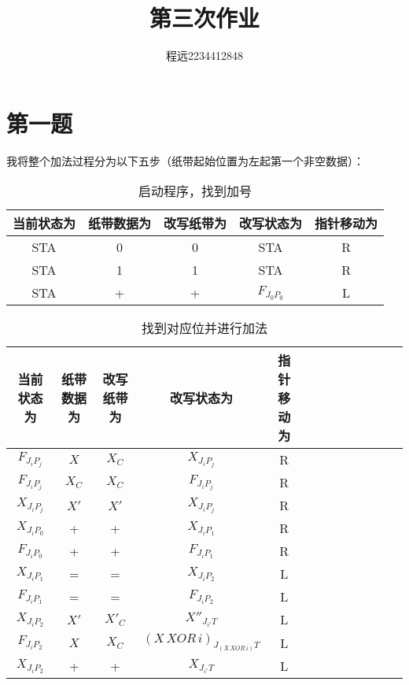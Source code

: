\documentclass[UTF8]{ctexart}
\begin{document}
\title{\vspace{0cm}第三次作业}
\author{程远2234412848}
\date{}
\maketitle

\section{第一题}

我将整个加法过程分为以下五步（纸带起始位置为左起第一个非空数据）：
\begin{table}[h!]
    \begin{center}
        \caption{启动程序，找到加号}
        \begin{tabular}{|c|c|c|c|c|}
            \hline
            当前状态为 & 纸带数据为 & 改写纸带为 & 改写状态为 & 指针移动为 \\
            \hline
            STA & 0 & 0 & STA & R \\
            \hline
            STA & 1 & 1 & STA & R \\
            \hline
            STA & + & + & $F_{J_{0}P_{0}}$ & L \\
            \hline
        \end{tabular}
    \end{center}
\end{table}


\begin{table}[h!]
    \begin{center}
        \caption{找到对应位并进行加法}
        \begin{tabular}{|c|c|c|c|c|c|c|c|c|c|c|c|c|}
            \hline
            当前状态为 & 纸带数据为 & 改写纸带为 & 改写状态为 & 指针移动为 \\
            \hline
            $F_{J_{i}P_{j}}$ & $X$ & $X_{C}$ & $X_{J_{i}P_{j}}$ & R \\
            \hline
            $F_{J_{i}P_{j}}$ & $X_{C}$ & $X_{C}$ & $F_{J_{i}P_{j}}$ & R \\
            \hline
            $X_{J_{i}P_{j}}$ & $X'$ & $X'$ & $X_{J_{i}P_{j}}$ & R \\
            \hline
            $X_{J_{i}P_{0}}$ & + & + & $X_{J_{i}P_{1}}$ & R \\
            \hline
            $F_{J_{i}P_{0}}$ & + & + & $F_{J_{i}P_{1}}$ & R \\
            \hline
            $X_{J_{i}P_{1}}$ & = & = & $X_{J_{i}P_{2}}$ & L \\
            \hline
            $F_{J_{i}P_{1}}$ & = & = & $F_{J_{i}P_{2}}$ & L \\
            \hline
            $X_{J_{i}P_{2}}$ & $X'$ & $X'_{C}$ & $X''_{J_{i'}T}$ & L \\
            \hline
            $F_{J_{i}P_{2}}$ & $X$ & $X_{C}$ & $(X\,XOR\,i)_{J_{(X\,XOR\,i)}T}$ & L\\
            \hline
            $X_{J_{i}P_{2}}$ & + & + & $X_{J_{i'}T}$ & L \\
            \hline
        \end{tabular}
    \end{center}
\end{table}
\end{document}
